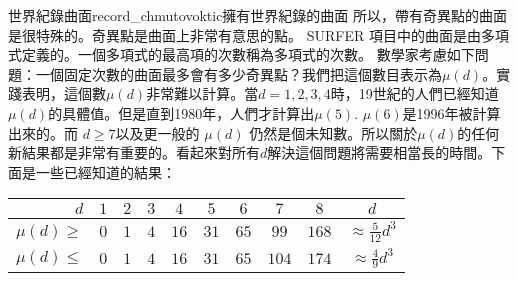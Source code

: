 \begin{surferIntroPage}{世界紀錄曲面}{record_chmutovoktic}{擁有世界紀錄的曲面}
所以，帶有奇異點的曲面是很特殊的。奇異點是曲面上非常有意思的點。 SURFER 項目中的曲面是由多項式定義的。一個多項式的最高項的次數稱為多項式的次數。
數學家考慮如下問題：一個固定次數的曲面最多會有多少奇異點？我們把這個數目表示為$\mu(d)$。實踐表明，這個數$\mu(d)$非常難以計算。當$d=1,2,3,4$時，19世紀的人們已經知道$\mu(d)$的具體值。但是直到1980年，人們才計算出$\mu(5)$.
$\mu(6)$是1996年被計算出來的。而 $d\ge 7$以及更一般的 $\mu(d)$ 仍然是個未知數。所以關於$\mu(d)$的任何新結果都是非常有重要的。看起來對所有$d$解決這個問題將需要相當長的時間。下面是一些已經知道的結果：
   \begin{center}
      \begin{tabular}{r|cccccccc|c}
        $d$ & $1$ & $2$ & $3$ & $4$ & $5$ & $6$ & $7$ & $8$ & $d$\\
        \hline
        \hline
        \rule{0pt}{1.2em}$\mu(d)\ge$ & $0$ & $1$ & $4$ & $16$ & $31$ & $65$ &
        $99$ & $168$ &
        $\approx \frac{5}{12}d^3$\\[0.3em]
        \hline
        \rule{0pt}{1.2em}$\mu(d)\le$ & $0$ & $1$ & $4$ & $16$ & $31$ & $65$ &
        $104$ & $174$ & $\approx \frac{4}{9}d^3$
      \end{tabular}
    \end{center}
\end{surferIntroPage}
